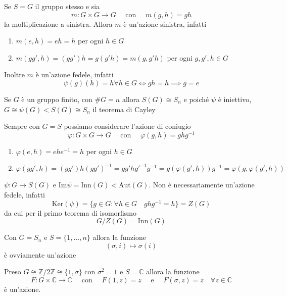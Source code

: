 \begin{example}
    Se \(S = G\) il gruppo stesso e sia
    \[
        m : G \times G \to G \quad \text{ con } \quad m{(g, h)} = gh
    \]
    la moltiplicazione a sinistra. Allora \(m\) è un'azione sinistra, infatti
\begin{enumerate}[label = \roman*)]
    \item \(m {(e, h)} = eh = h\) per ogni \(h \in G\) 
    \item \(m {(gg', h)} = {(g g')}h = g{(g'h)} = m {(g, g'h)}\) per ogni \(g,
        g', h \in G\) 
\end{enumerate}
    Inoltre \(m\) è un'azione fedele, infatti 
    \[
        \psi{(g)}{(h)} = h \forall h \in G \iff gh = h \implies g = e
    \]
    \begin{remark}
        Se \(G\) è un gruppo finito, con \(\# G = n\) allora \(S{(G)} \cong S_n\)
        e poiché \(\psi\) è iniettivo, \(G \cong \psi{(G)} < S{(G)} \cong S_n\)
        il teorema di Cayley
    \end{remark}
\end{example}
\begin{example}
    Sempre con \(G = S\) possiamo considerare l'azione di coniugio
    \[
        \varphi : G \times G \to G \quad \text{ con } \quad \varphi{(g, h)} =
        ghg^{-1}
    \]
    \begin{enumerate}[label = \roman*)]
        \item \(\varphi{(e, h)} = ehe^{-1} = h\) per ogni \(h \in G\)
        \item \(\varphi {(g g', h)} = {(g g')}h {( g g' )}^{-1} = g g' h g'^{-1}
            g^{-1} = g{(\varphi {(g', h)})} g ^{-1} = \varphi {(g, \varphi {(g',
            h)})}\) 
    \end{enumerate}
    \(\psi : G \to S(G)\) e \(\text{Im} \psi = \text{Inn} {(G)} <
    \text{Aut}{(G)}\). Non è necessariamente un'azione fedele, infatti
    \[
        \text{Ker}{(\psi)} = \{g \in G : \forall h \in G \quad ghg^{-1} = h\} =
        Z(G)
    \]
    da cui per il primo teorema di isomorfismo
    \[
      G / Z{(G)} = \text{Inn}{(G)}
    \]
\end{example}
\begin{example}
    Con \(G = S_n\) e \(S = \{1, \dots, n\} \) allora la funzione
    \[
        (\sigma, i) \mapsto \sigma{(i)}
    \]
    è ovviamente un'azione
\end{example}
\begin{example}
    Preso \(G \cong \mathbb{Z} / 2 \mathbb{Z} \cong \{1, \sigma\} \) con
    \(\sigma^2 = 1\)  e \(S = \mathbb{C}\) allora la funzione
    \[
        F : G \times \mathbb{C} \to \mathbb{C} \quad \text{ con } \quad F{(1,
        z)} = z \quad \text{ e } \quad F{(\sigma, z)} = \overline{z} \quad
        \forall z \in \mathbb{C}
    \]
    è un'azione.
\end{example}

